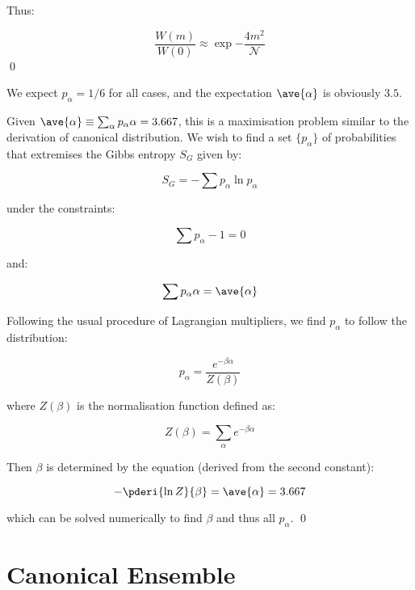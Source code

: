 \documentclass[12pt]{article}
\begin{document}
Thus:

\begin{equation}
\frac{W(m)}{W(0)} \approx \exp{-\frac{4m^{2}}{\mathcal{N}}}
\end{equation}
\qed


We expect $p_{\alpha} = 1/6$ for all cases, and the expectation $\ave{\alpha}$ is obviously $3.5$.

Given $\ave{\alpha} \equiv \sum_{\alpha} p_{\alpha} \alpha = 3.667$, this is a maximisation problem similar to the derivation of canonical distribution. We wish to find a set $\{p_{\alpha}\}$ of probabilities that extremises the Gibbs entropy $S_{G}$ given by:

\begin{equation}
S_{G} = - \sum p_{\alpha} \ln{p_{\alpha}}
\end{equation}

under the constraints:

\begin{equation}
\sum p_{\alpha} - 1 = 0
\end{equation}

and:

\begin{equation}
\sum p_{\alpha} \alpha = \ave{\alpha}
\end{equation}

Following the usual procedure of Lagrangian multipliers, we find $p_{\alpha}$ to follow the distribution:

\begin{equation}
p_{\alpha} = \frac{e^{-\beta \alpha}}{Z(\beta)}
\end{equation}

where $Z(\beta)$ is the normalisation function defined as:

\begin{equation}
Z(\beta) = \sum_{\alpha} e^{-\beta \alpha}
\end{equation}

Then $\beta$ is determined by the equation (derived from the second constant):

\begin{equation}
- \pderi{\ln{Z}}{\beta} = \ave{\alpha} = 3.667
\end{equation}

which can be solved numerically to find $\beta$ and thus all $p_{\alpha}$.
\qed


\pagebreak
\section*{Canonical Ensemble}
\end{document}
